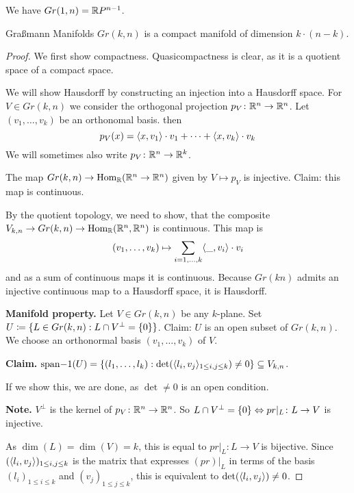 \documentclass[language=english]{TemplateLecture}
\begin{document}

\begin{Example}
    We have \(Gr(1,n) = \mathbb{R} P^{n-1}\).
\end{Example}

\begin{thm}{Graßmann Manifolds}{}
    \(Gr(k,n)\) is a compact manifold of dimension \(k \cdot (n-k)\).
\end{thm}

\begin{proof}
    We first show compactness. Quasicompactness is clear, as it is a quotient space of a compact space.

    We will show Hausdorff by constructing an injection into a Hausdorff space. For \(V \in Gr(k,n)\) we consider the orthogonal projection \(p_V\colon \mathbb{R}^n \to \mathbb{R}^n\). Let \((v_1, \dots, v_k)\) be an orthonomal basis. then
    \[p_V(x) = \langle x,v_1\rangle \cdot v_1 + \dots + \langle x, v_k\rangle \cdot v_k\]
    We will sometimes also write \(p_V \colon \mathbb{R}^n \to \mathbb{R}^k\).

    The map \(Gr(k,n) \to \operatorname{Hom}_{\mathbb{R}}(\mathbb{R}^n \to \mathbb{R}^n)\) given by \(V \mapsto p_V\) is injective. Claim: this map is continuous.

    By the quotient topology, we need to show, that the composite \(V_{k,n} \to Gr(k,n) \to \operatorname{Hom}_{\mathbb{R}}(\mathbb{R}^n, \mathbb{R}^n) \) is continuous. This map is
    \[(v_1, \dots, v_k) \mapsto \sum_{i = 1, \dots, k} \langle\_, v_i\rangle \cdot v_i\]
    and as a sum of continuous maps it is continuous.
    Because \(Gr(kn)\) admits an injective continuous map to a Hausdorff space, it is Hausdorff.

    \textbf{Manifold property.} Let \(V \in Gr(k,n)\) be any \(k\)-plane. Set \(U \coloneq \{L \in Gr(k,n) : L \cap V^\perp = \{0\}\}\). Claim: \(U\) is an open subset of \(Gr(k,n)\). We choose an orthonormal basis \((v_1, \dots, v_k)\) of \(V\).

    \textbf{Claim.} \(\mathrm{span}{-1}(U) = \{(l_1, \dots, l_k) : \det(\langle l_i, v_j\rangle_{1 \leq i,j \leq k}) \neq 0\} \subseteq V_{k,n}\).

    If we show this, we are done, as \(\det \neq 0\) is an open condition.

    \textbf{Note.} \(V^\perp\) is the kernel of \(p_V \colon \mathbb{R}^n \to \mathbb{R}^n\). So \(L \cap V^\perp = \{0\} \Leftrightarrow pr\rvert_L \colon L \to V\) is injective.
    
    As \(\dim(L) = \dim(V) = k\), this is equal to \(pr\rvert_L\colon L \to V\) is bijective. Since \((\langle l_i, v_j\rangle)_{1 \leq i,j \leq k}\) is the matrix that expresses \((pr)\rvert_L\) in terms of the basis \((l_i)_{1 \leq i \leq k}\) and \((v_j)_{1 \leq j \leq k}\), this is equivalent to \(\det(\langle l_i, v_j\rangle) \neq 0\).


\end{proof}
\end{document}
